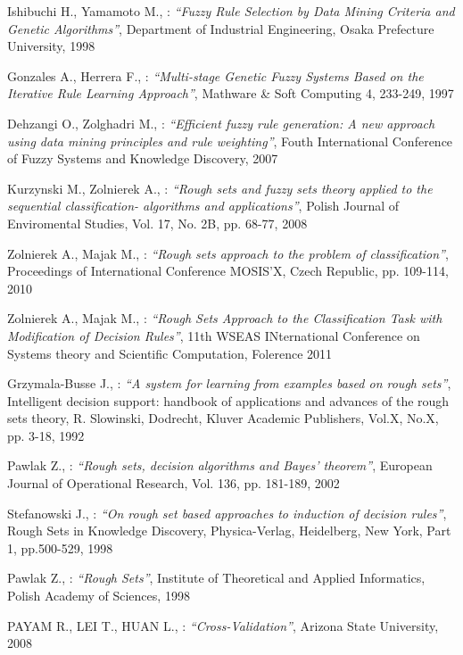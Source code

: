 \begin{thebibliography}{99}
	Ishibuchi H., Yamamoto M., : \textit{``Fuzzy Rule Selection by Data Mining Criteria and Genetic Algorithms''}, 
    Department of Industrial Engineering, Osaka Prefecture University, 1998

	Gonzales A., Herrera F., : \textit{``Multi-stage Genetic Fuzzy Systems
    Based on the Iterative Rule Learning Approach''}, 
    Mathware \& Soft Computing 4, 233-249, 1997

	Dehzangi O., Zolghadri M., : \textit{``Efficient fuzzy rule generation: A
    new approach using data mining principles and rule weighting''}, 
    Fouth International Conference of Fuzzy Systems and Knowledge Discovery, 2007

	Kurzynski M., Zolnierek A., : \textit{``Rough sets and fuzzy sets theory
    applied to the sequential classification- algorithms and applications''}, 
    Polish Journal of Enviromental Studies, Vol. 17, No. 2B, pp. 68-77, 2008

	Zolnierek A., Majak M., : \textit{``Rough sets approach to the problem of
    classification''}, 
    Proceedings of International Conference MOSIS'X, Czech Republic, pp.
    109-114, 2010

	Zolnierek A., Majak M., : \textit{``Rough Sets Approach to the
    Classification Task with Modification of Decision Rules''}, 
    11th WSEAS INternational Conference on Systems theory and Scientific
    Computation, Folerence 2011

	Grzymala-Busse J., : \textit{``A system for learning from examples based on rough sets''}, 
    Intelligent decision support: handbook of applications and advances of the
    rough sets theory, R. Slowinski, Dodrecht, Kluver Academic Publishers,
    Vol.X, No.X, pp. 3-18, 1992

	Pawlak Z., : \textit{``Rough sets, decision algorithms and Bayes’ theorem''}, 
    European Journal of Operational Research, Vol. 136, pp. 181-189, 2002

	Stefanowski J., : \textit{``On rough set based approaches to induction of decision rules''}, 
    Rough Sets in Knowledge Discovery, Physica-Verlag, Heidelberg, New York,
    Part 1, pp.500-529, 1998

	Pawlak Z., : \textit{``Rough Sets''}, 
    Institute of Theoretical and Applied Informatics, Polish Academy of
    Sciences, 1998

	PAYAM R., LEI T., HUAN L., : \textit{``Cross-Validation''}, Arizona State University, 2008



\end{thebibliography}
